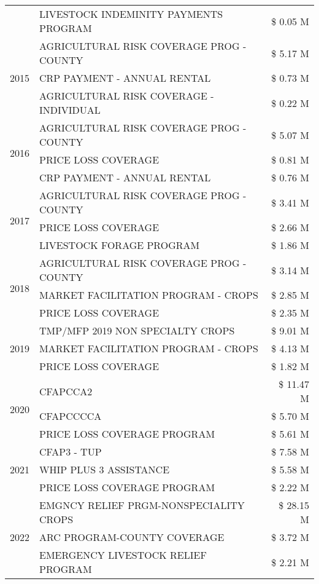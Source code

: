 \begin{tabular}{llr}
 & LIVESTOCK INDEMINITY PAYMENTS PROGRAM & \$ 0.05 M \\
\cline{1-3}
\multirow[t]{3}{*}{2015} & AGRICULTURAL RISK COVERAGE PROG - COUNTY & \$ 5.17 M \\
 & CRP PAYMENT - ANNUAL RENTAL & \$ 0.73 M \\
 & AGRICULTURAL RISK COVERAGE - INDIVIDUAL & \$ 0.22 M \\
\cline{1-3}
\multirow[t]{3}{*}{2016} & AGRICULTURAL RISK COVERAGE PROG - COUNTY & \$ 5.07 M \\
 & PRICE LOSS COVERAGE & \$ 0.81 M \\
 & CRP PAYMENT - ANNUAL RENTAL & \$ 0.76 M \\
\cline{1-3}
\multirow[t]{3}{*}{2017} & AGRICULTURAL RISK COVERAGE PROG - COUNTY & \$ 3.41 M \\
 & PRICE LOSS COVERAGE & \$ 2.66 M \\
 & LIVESTOCK FORAGE PROGRAM & \$ 1.86 M \\
\cline{1-3}
\multirow[t]{3}{*}{2018} & AGRICULTURAL RISK COVERAGE PROG - COUNTY & \$ 3.14 M \\
 & MARKET FACILITATION PROGRAM - CROPS & \$ 2.85 M \\
 & PRICE LOSS COVERAGE & \$ 2.35 M \\
\cline{1-3}
\multirow[t]{3}{*}{2019} & TMP/MFP 2019 NON SPECIALTY CROPS & \$ 9.01 M \\
 & MARKET FACILITATION PROGRAM - CROPS & \$ 4.13 M \\
 & PRICE LOSS COVERAGE & \$ 1.82 M \\
\cline{1-3}
\multirow[t]{3}{*}{2020} & CFAPCCA2 & \$ 11.47 M \\
 & CFAPCCCCA & \$ 5.70 M \\
 & PRICE LOSS COVERAGE PROGRAM & \$ 5.61 M \\
\cline{1-3}
\multirow[t]{3}{*}{2021} & CFAP3 - TUP & \$ 7.58 M \\
 & WHIP PLUS 3 ASSISTANCE & \$ 5.58 M \\
 & PRICE LOSS COVERAGE PROGRAM & \$ 2.22 M \\
\cline{1-3}
\multirow[t]{3}{*}{2022} & EMGNCY RELIEF PRGM-NONSPECIALITY CROPS & \$ 28.15 M \\
 & ARC PROGRAM-COUNTY COVERAGE & \$ 3.72 M \\
 & EMERGENCY LIVESTOCK RELIEF PROGRAM & \$ 2.21 M \\
\cline{1-3}
\bottomrule
\end{tabular}
